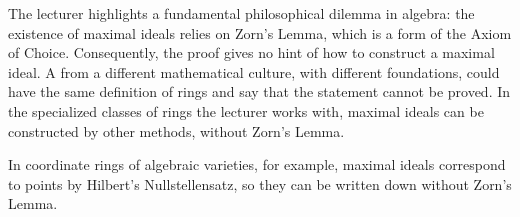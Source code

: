 \begin{content}
\begin{center}
\end{center}
\end{content}

\begin{insight}
The lecturer highlights a fundamental philosophical dilemma in algebra: the existence of maximal ideals relies on Zorn's Lemma, which is a form of the Axiom of Choice. Consequently, the proof gives no hint of how to construct a maximal ideal. A  from a different mathematical culture, with different foundations, could have the same definition of rings and say that the statement cannot be proved. In the specialized classes of rings the lecturer works with, maximal ideals can be constructed by other methods, without Zorn's Lemma.
\end{insight}

\begin{aiNote}
In coordinate rings of algebraic varieties, for example, maximal ideals correspond to points by Hilbert's Nullstellensatz, so they can be written down without Zorn's Lemma.
\end{aiNote}

